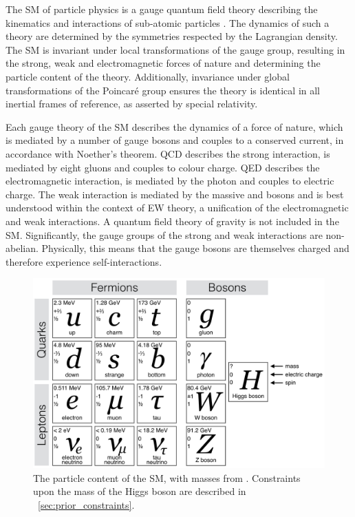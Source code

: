 
The \ac{SM} of particle physics is a gauge quantum field theory describing the kinematics and interactions of sub-atomic particles \cite{Aitchison,Peskin}. The dynamics of such a 
theory are determined by the symmetries respected by the Lagrangian density.
The \ac{SM} is invariant under local transformations of the \SMgroup gauge group,
resulting in the strong, weak and electromagnetic forces of nature and determining
the particle content of the theory. Additionally, invariance under global 
transformations of the Poincaré group ensures the theory is identical in all 
inertial frames of reference, as asserted by special relativity.

Each gauge theory of the \ac{SM} describes the dynamics of a force of nature, which 
is mediated by a number of gauge bosons and couples to a conserved current, in 
accordance with Noether's theorem. \ac{QCD} describes the strong 
interaction, is mediated by eight gluons and couples to colour charge. \ac{QED}
describes the electromagnetic interaction, is mediated by the 
photon and couples to electric charge. The weak interaction is mediated by the massive 
\PWpm and \PZ bosons and is best understood within the context of \ac{EW} theory,
a unification of the electromagnetic and weak interactions. A quantum field theory of
gravity is not included in the \ac{SM}. Significantly, the gauge groups of 
the strong and weak interactions are non-abelian. Physically, this means that the
gauge bosons are themselves charged and therefore experience self-interactions.

\begin{figure}
	\includegraphics[width=\largefigwidth]{tex/motivation/sm_particles}
	\caption{The particle content of the \ac{SM}, with masses from \cite{PDG}. Constraints
	upon the mass of the Higgs boson are described in \Section~\ref{sec:prior_constraints}.}
	\label{fig:sm_particles}
\end{figure}

